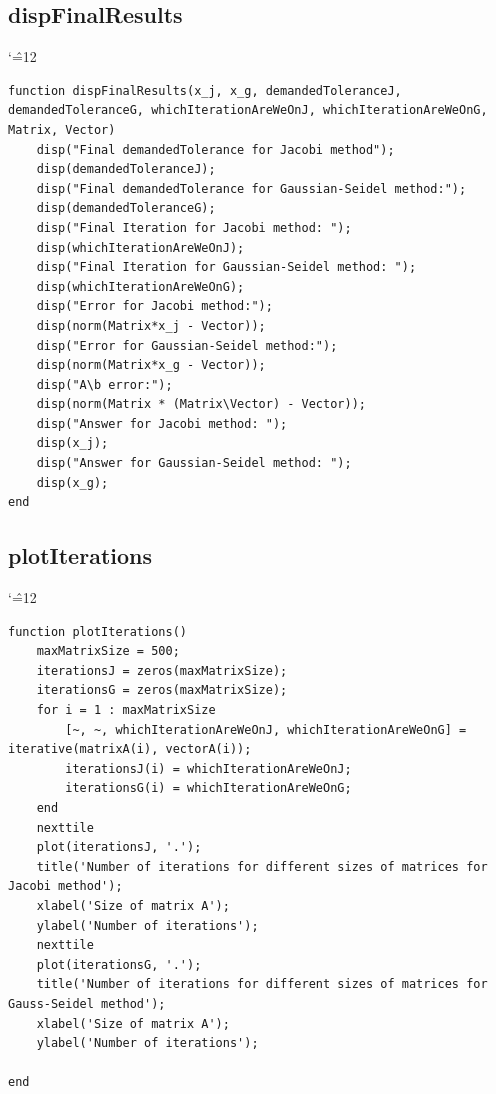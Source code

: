 \documentclass[12pt]{report}
\newenvironment{simplechar}{%
   \catcode`\^=12
}{}
\begin{document}
\subsection{dispFinalResults}
\begin{simplechar}
\begin{lstlisting}
function dispFinalResults(x_j, x_g, demandedToleranceJ, demandedToleranceG, whichIterationAreWeOnJ, whichIterationAreWeOnG, Matrix, Vector)
    disp("Final demandedTolerance for Jacobi method");
    disp(demandedToleranceJ);
    disp("Final demandedTolerance for Gaussian-Seidel method:");
    disp(demandedToleranceG);
    disp("Final Iteration for Jacobi method: ");
    disp(whichIterationAreWeOnJ);
    disp("Final Iteration for Gaussian-Seidel method: ");
    disp(whichIterationAreWeOnG);
    disp("Error for Jacobi method:");
    disp(norm(Matrix*x_j - Vector));
    disp("Error for Gaussian-Seidel method:");
    disp(norm(Matrix*x_g - Vector));
    disp("A\b error:");
    disp(norm(Matrix * (Matrix\Vector) - Vector));
    disp("Answer for Jacobi method: ");
    disp(x_j);
    disp("Answer for Gaussian-Seidel method: ");
    disp(x_g);
end
\end{lstlisting}
\end{simplechar}

\subsection{plotIterations}
\begin{simplechar}
\begin{lstlisting}
function plotIterations()
    maxMatrixSize = 500;
    iterationsJ = zeros(maxMatrixSize);
    iterationsG = zeros(maxMatrixSize);
    for i = 1 : maxMatrixSize
        [~, ~, whichIterationAreWeOnJ, whichIterationAreWeOnG] = iterative(matrixA(i), vectorA(i));
        iterationsJ(i) = whichIterationAreWeOnJ;
        iterationsG(i) = whichIterationAreWeOnG;
    end
    nexttile
    plot(iterationsJ, '.');
    title('Number of iterations for different sizes of matrices for Jacobi method');
    xlabel('Size of matrix A');
    ylabel('Number of iterations');
    nexttile
    plot(iterationsG, '.');
    title('Number of iterations for different sizes of matrices for Gauss-Seidel method');
    xlabel('Size of matrix A');
    ylabel('Number of iterations');

end
\end{lstlisting}
\end{simplechar}
\end{document}
